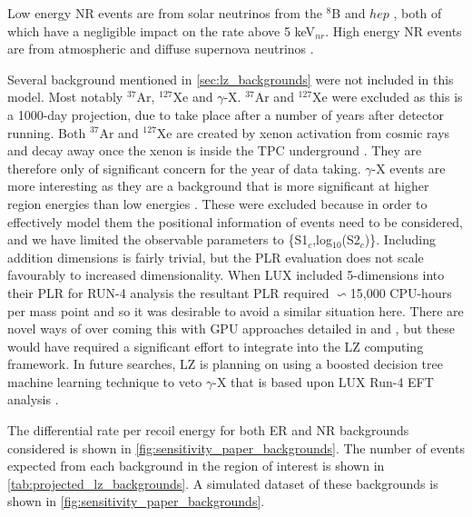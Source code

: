 Low energy NR events are from solar neutrinos from the $^{8}$B \cite{b8_neutrino_rate_ref} and $hep$ \cite{solar_neutrinos_rate_ref}, both of which have a negligible impact on the rate above 5 keV$_{nr}$.
High energy NR events are from atmospheric \cite{atmospheric_neutrinos_rate_ref} and diffuse supernova neutrinos \cite{dissuse_supernova_neutrinos_rate_ref}.
\par
Several background mentioned in \autoref{sec:lz_backgrounds} were not included in this model.
Most notably $^{37}$Ar, $^{127}$Xe and $\gamma$-X.
$^{37}$Ar and $^{127}$Xe were excluded as this is a 1000-day projection, due to take place after a number of years after detector running.
Both $^{37}$Ar and $^{127}$Xe are created by xenon activation from cosmic rays and decay away once the xenon is inside the TPC underground \cite{lz_argon37_ref, lux_xenon_activation_ref}.
They are therefore only of significant concern for the year of data taking.
$\gamma$-X events are more interesting as they are a background that is more significant at higher region energies than low energies \cite{gregrischbieter_thesis_ref}.
These were excluded because in order to effectively model them the positional information of events need to be considered, and we have limited the observable parameters to \{S1$_c$,log$_{10}$(S2$_c$)\}.
Including addition dimensions is fairly trivial, but the PLR evaluation does not scale favourably to increased dimensionality.
When LUX included 5-dimensions into their PLR for RUN-4 analysis the resultant PLR required $\backsim$15,000 CPU-hours per mass point \cite{billyboxer_thesis_ref} and so it was desirable to avoid a similar situation here.
There are novel ways of over coming this with GPU approaches detailed in \cite{flamenest_ref} and \cite{lux_ml_plr_ref}, but these would have required a significant effort to integrate into the LZ computing framework.
In future searches, LZ is planning on using a boosted decision tree machine learning technique to veto $\gamma$-X that is based upon LUX Run-4 EFT analysis \cite{LUX_RUN4_EFT_2021}.

\par
The differential rate per recoil energy for both ER and NR backgrounds considered is shown in \autoref{fig:sensitivity_paper_backgrounds}.
The number of events expected from each background in the region of interest is shown in \autoref{tab:projected_lz_backgrounds}.
A simulated dataset of these backgrounds is shown in  \autoref{fig:sensitivity_paper_backgrounds}.

